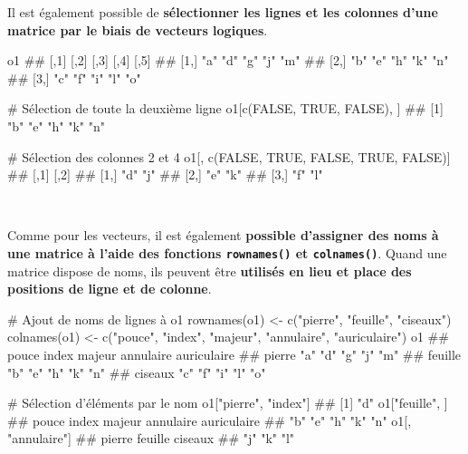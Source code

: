 \documentclass[12pt,twosided, notitlepage]{book}
\newenvironment{Shaded}{}{}
\newcommand{\KeywordTok}[1]{\textcolor[rgb]{0.00,0.00,1.00}{{#1}}}
\newcommand{\StringTok}[1]{\textcolor[rgb]{0.00,0.50,0.50}{{#1}}}
\newcommand{\CommentTok}[1]{\textcolor[rgb]{0.00,0.50,0.00}{{#1}}}
\newcommand{\OtherTok}[1]{\textcolor[rgb]{1.00,0.25,0.00}{{#1}}}
\newcommand{\NormalTok}[1]{{#1}}
\renewenvironment{Shaded}{\begin{snugshade}}{\end{snugshade}}
\begin{document}
Il est également possible de \textbf{sélectionner les lignes et les
colonnes d'une matrice par le biais de vecteurs logiques}.

\begin{Shaded}
\begin{Highlighting}[]
\NormalTok{o1}
  \NormalTok{##      [,1] [,2] [,3] [,4] [,5]}
  \NormalTok{## [1,] "a"  "d"  "g"  "j"  "m" }
  \NormalTok{## [2,] "b"  "e"  "h"  "k"  "n" }
  \NormalTok{## [3,] "c"  "f"  "i"  "l"  "o"}

\CommentTok{# Sélection de toute la deuxième ligne}
\NormalTok{o1[}\KeywordTok{c}\NormalTok{(}\OtherTok{FALSE}\NormalTok{, }\OtherTok{TRUE}\NormalTok{, }\OtherTok{FALSE}\NormalTok{), ]}
  \NormalTok{## [1] "b" "e" "h" "k" "n"}

\CommentTok{# Sélection des colonnes 2 et 4}
\NormalTok{o1[, }\KeywordTok{c}\NormalTok{(}\OtherTok{FALSE}\NormalTok{, }\OtherTok{TRUE}\NormalTok{, }\OtherTok{FALSE}\NormalTok{, }\OtherTok{TRUE}\NormalTok{, }\OtherTok{FALSE}\NormalTok{)]}
  \NormalTok{##      [,1] [,2]}
  \NormalTok{## [1,] "d"  "j" }
  \NormalTok{## [2,] "e"  "k" }
  \NormalTok{## [3,] "f"  "l"}
\end{Highlighting}
\end{Shaded}

~

Comme pour les vecteurs, il est également \textbf{possible d'assigner
des noms à une matrice à l'aide des fonctions \texttt{rownames()} et
\texttt{colnames()}}.
Quand une matrice dispose de noms, ils peuvent être \textbf{utilisés en
lieu et place des positions de ligne et de colonne}.

\begin{Shaded}
\begin{Highlighting}[]
\CommentTok{# Ajout de noms de lignes à o1}
\KeywordTok{rownames}\NormalTok{(o1) <-}\StringTok{ }\KeywordTok{c}\NormalTok{(}\StringTok{"pierre"}\NormalTok{, }\StringTok{"feuille"}\NormalTok{, }\StringTok{"ciseaux"}\NormalTok{)}
\KeywordTok{colnames}\NormalTok{(o1) <-}\StringTok{ }\KeywordTok{c}\NormalTok{(}\StringTok{"pouce"}\NormalTok{, }\StringTok{"index"}\NormalTok{, }\StringTok{"majeur"}\NormalTok{, }\StringTok{"annulaire"}\NormalTok{, }\StringTok{"auriculaire"}\NormalTok{)}
\NormalTok{o1}
  \NormalTok{##         pouce index majeur annulaire auriculaire}
  \NormalTok{## pierre  "a"   "d"   "g"    "j"       "m"        }
  \NormalTok{## feuille "b"   "e"   "h"    "k"       "n"        }
  \NormalTok{## ciseaux "c"   "f"   "i"    "l"       "o"}

\CommentTok{# Sélection d'éléments par le nom}
\NormalTok{o1[}\StringTok{"pierre"}\NormalTok{, }\StringTok{"index"}\NormalTok{]}
  \NormalTok{## [1] "d"}
\NormalTok{o1[}\StringTok{"feuille"}\NormalTok{, ]}
  \NormalTok{##       pouce       index      majeur   annulaire auriculaire }
  \NormalTok{##         "b"         "e"         "h"         "k"         "n"}
\NormalTok{o1[, }\StringTok{"annulaire"}\NormalTok{]}
  \NormalTok{##  pierre feuille ciseaux }
  \NormalTok{##     "j"     "k"     "l"}
\end{Highlighting}
\end{Shaded}
\end{document}
